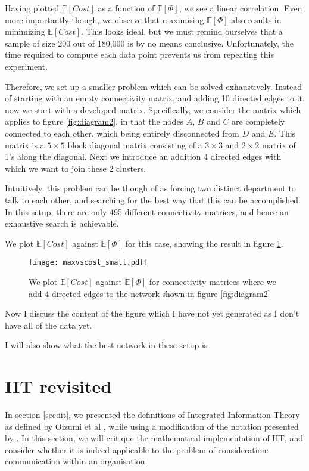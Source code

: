 Having plotted $\mathbb{E}[Cost]$ as a function of $\mathbb{E}[\Phi]$, we see a linear correlation. Even more importantly though, we observe that maximising $\mathbb{E}[\Phi]$ also results in minimizing $\mathbb{E}[Cost]$. This looks ideal, but we must remind ourselves that a sample of size 200 out of 180,000 is by no means conclusive. Unfortunately, the time required to compute each data point prevents us from repeating this experiment. 


Therefore, we set up a smaller problem which can be solved exhaustively. Instead of starting with an empty connectivity matrix, and adding 10 directed edges to it, now we start with a developed matrix. Specifically, we consider the matrix which applies to figure \ref{fig:diagram2}, in that the nodes $A$, $B$ and $C$ are completely connected to each other, which being entirely disconnected from $D$ and $E$. This matrix is a $5\times 5$ block diagonal matrix consisting of a $3 \times 3$ and $2 \times 2$ matrix of 1's along the diagonal. Next we introduce an addition 4 directed edges with which we want to join these 2 clusters.

Intuitively, this problem can be though of as forcing two distinct department to talk to each other, and searching for the best way that this can be accomplished. In this setup, there are only 495 different connectivity matrices, and hence an exhaustive search is achievable.

We plot $\mathbb{E}[Cost]$ against $\mathbb{E}[\Phi]$ for this case, showing the result in figure \ref{fig:maxvscost_small}.

\begin{figure}
	\centering
	\texttt{[image: maxvscost\_small.pdf]}
	\caption{We plot  $\mathbb{E}[Cost]$ against $\mathbb{E}[\Phi]$ for connectivity matrices where we add 4 directed edges to the network shown in figure \ref{fig:diagram2}}
	\label{fig:maxvscost_small}
\end{figure}

Now I discuss the content of the figure which I have not yet generated as I don't have all of the data yet.

I will also show what the best network in these setup is

\section{IIT revisited}
In section \ref{sec:iit}, we presented the definitions of Integrated Information Theory as defined by Oizumi et al \cite{oizumi2014phenomenology}, while using a modification of the notation presented by \cite{krohn2016computing}. In this section, we will critique the mathematical implementation of IIT, and consider whether it is indeed applicable to the problem of consideration: communication within an organisation.

